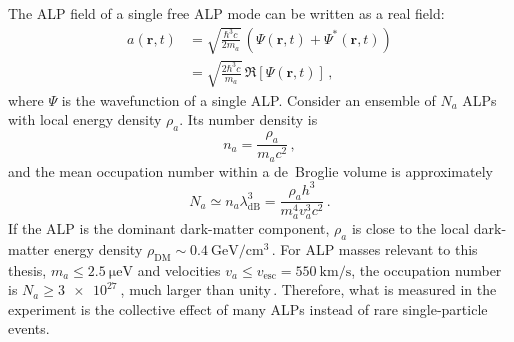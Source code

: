 The ALP field of a single free ALP mode can be written as a real field:
\begin{align}
     a(\boldsymbol{r},t)
     &=\sqrt{\frac{\hbar^3c}{2 m_a}}\,
      \left(\Psi(\boldsymbol{r},t) + \Psi^*(\boldsymbol{r},t)\right)\\
    &=\sqrt{\frac{2\hbar^3c}{m_a}}\,
      \Re\left[\Psi(\boldsymbol{r},t)\right]
    \,,\label{eq:ALP_single_wavefunction}
\end{align}
where $\Psi$ is the wavefunction of a single ALP.
Consider an ensemble of $N_a$ ALPs with local energy density $\rho_a$.
Its number density is
\begin{equation}
    n_a=\frac{\rho_a}{m_a c^2}
    \,,\label{eq:na}
\end{equation}
and the mean occupation number within a de~Broglie volume is approximately
\begin{equation}
    N_a\simeq n_a\lambda_{\mathrm{dB}}^3
    =\frac{\rho_a h^3}{m_a^4 v_a^3 c^2}
    \,.\label{eq:occupation}
\end{equation}
If the ALP is the dominant dark-matter component, $\rho_a$ is close to the local dark-matter energy density $\rho_\mathrm{DM} \sim \SI{0.4}{\GeV/\cm^3}$\,\cite{Evans2019_SHMRefined}.
For ALP masses relevant to this thesis, $m_a \leq \SI{2.5}{\micro\electronvolt}$ and velocities $v_a \leq v_\mathrm{esc} = \SI{550}{\km/\s}$, the occupation number is $N_a \geq \SI{3e27}{}$, much larger than unity\,\cite{Zhang2026_Dissertation_ipynb_1_introduction}.
Therefore, what is measured in the experiment is the collective effect of many ALPs instead of rare single-particle events.

